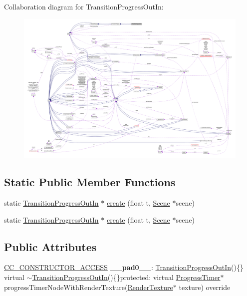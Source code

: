 Collaboration diagram for Transition\+Progress\+Out\+In\+:
\nopagebreak
\begin{figure}[H]
\begin{center}
\leavevmode
\includegraphics[width=350pt]{classTransitionProgressOutIn__coll__graph}
\end{center}
\end{figure}
\subsection*{Static Public Member Functions}
\begin{DoxyCompactItemize}
\item 
static \hyperlink{classTransitionProgressOutIn}{Transition\+Progress\+Out\+In} $\ast$ \hyperlink{classTransitionProgressOutIn_a3ec6efb28d06f358834aeed017eba7aa}{create} (float t, \hyperlink{classScene}{Scene} $\ast$scene)
\item 
static \hyperlink{classTransitionProgressOutIn}{Transition\+Progress\+Out\+In} $\ast$ \hyperlink{classTransitionProgressOutIn_a53f81a859e993393dcac961c4f803635}{create} (float t, \hyperlink{classScene}{Scene} $\ast$scene)
\end{DoxyCompactItemize}
\subsection*{Public Attributes}
\begin{DoxyCompactItemize}
\item 
\mbox{\label{classTransitionProgressOutIn_a76fd3d0fb5a2b96e2333a590f4eb0029}} 
\hyperlink{_2cocos2d_2cocos_2base_2ccConfig_8h_a25ef1314f97c35a2ed3d029b0ead6da0}{C\+C\+\_\+\+C\+O\+N\+S\+T\+R\+U\+C\+T\+O\+R\+\_\+\+A\+C\+C\+E\+SS} {\bfseries \+\_\+\+\_\+pad0\+\_\+\+\_\+}\+: \hyperlink{classTransitionProgressOutIn}{Transition\+Progress\+Out\+In}()\{\} virtual $\sim$\hyperlink{classTransitionProgressOutIn}{Transition\+Progress\+Out\+In}()\{\}protected\+: virtual \hyperlink{classProgressTimer}{Progress\+Timer}$\ast$ progress\+Timer\+Node\+With\+Render\+Texture(\hyperlink{classRenderTexture}{Render\+Texture}$\ast$ texture) override
\end{DoxyCompactItemize}
